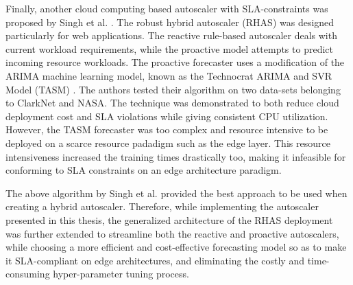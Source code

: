 Finally, another cloud computing based autoscaler with SLA-constraints was proposed by Singh et al. \cite{singh2021rhas}. The robust hybrid autoscaler (RHAS) was designed particularly for web applications. The reactive rule-based autoscaler deals with current workload requirements, while the proactive model attempts to predict incoming resource workloads. The proactive forecaster uses a modification of the ARIMA machine learning model, known as the Technocrat ARIMA and SVR Model (TASM) \cite{singh2019tasm}. The authors tested their algorithm on two data-sets belonging to ClarkNet and NASA. The technique was demonstrated to both reduce cloud deployment cost and SLA violations while giving consistent CPU utilization. However, the TASM forecaster was too complex and resource intensive to be deployed on a scarce resource padadigm such as the edge layer. This resource intensiveness increased the training times drastically too, making it infeasible for conforming to SLA constraints on an edge architecture paradigm.\par

The above algorithm by Singh et al. \cite{singh2021rhas} provided the best approach to be used when creating a hybrid autoscaler. Therefore, while implementing the autoscaler presented in this thesis, the generalized architecture of the RHAS deployment was further extended to streamline both the reactive and proactive autoscalers, while choosing a more efficient and cost-effective forecasting model so as to make it SLA-compliant on edge architectures, and eliminating the costly and time-consuming hyper-parameter tuning process.\par

